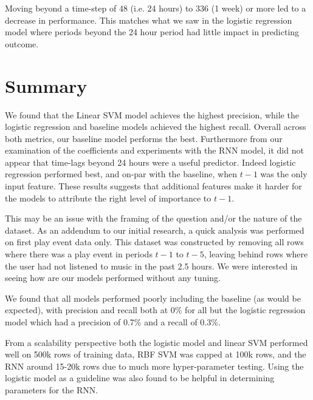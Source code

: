 Moving beyond a time-step of 48 (i.e. 24 hours) to 336 (1 week) or more led to a decrease in performance. This matches what we saw in the logistic regression model where periods beyond the 24 hour period had little impact in predicting outcome.

\section{Summary}

We found that the Linear SVM model achieves the highest precision, while the logistic regression and baseline models achieved the highest recall. Overall across both metrics, our baseline model performs the best. Furthermore from our examination of the coefficients and experiments with the RNN model, it did not appear that time-lags beyond 24 hours were a useful predictor. Indeed logistic regression performed best, and on-par with the baseline, when $t-1$ was the only input feature. These results suggests that additional features make it harder for the models to attribute the right level of importance to $t-1$. 

This may be an issue with the framing of the question and/or the nature of the dataset. As an addendum to our initial research, a quick analysis was performed on first play event data only. This dataset was constructed by removing all rows where there was a play event in periods $t-1$ to $t-5$, leaving behind rows where the user had not listened to music in the past 2.5 hours. We were interested in seeing how are our models performed without any tuning.

We found that all models performed poorly including the baseline (as would be expected), with precision and recall both at 0\% for all but the logistic regression model which had a precision of 0.7\% and a recall of 0.3\%. 

From a scalability perspective both the logistic model and linear SVM performed well on 500k rows of training data, RBF SVM was capped at 100k rows, and the RNN around 15-20k rows due to much more hyper-parameter testing. Using the logistic model as a guideline was also found to be helpful in determining parameters for the RNN. 